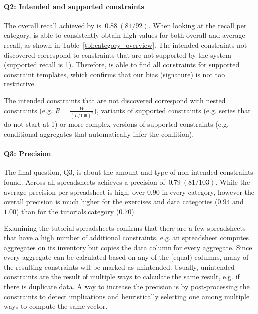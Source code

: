 \paragraph{Q2: Intended and supported constraints}
The overall recall achieved by \sname is~$0.88~(81/92)$.
When looking at the recall per category, \sname is able to consistently obtain high values for both overall and average recall, as shown in Table~\ref{tbl:category_overview}.
The intended constraints not discovered correspond to constraints that are not supported by the system (supported recall is 1).
Therefore, \sname is able to find all constraints for supported constraint templates, which confirms that our bias (signature) is not too restrictive.

The intended constraints that are not discovered correspond with nested constraints (e.g. $R = \frac{W}{(L/100)^2}$), variants of supported constraints (e.g. series that do not start at 1) or more complex versions of supported constraints (e.g. conditional aggregates that automatically infer the condition).

\paragraph{Q3: Precision}
The final question, Q3, is about the amount and type of non-intended constraints found.
Across all spreadsheets \sname achieves a precision of~$0.79~(81/103)$.
While the average precision per spreadsheet is high, over $0.90$ in every category, however the overall precision is much higher for the exercises and data categories ($0.94$ and $1.00$) than for the tutorials category ($0.70$).

Examining the tutorial spreadsheets confirms that there are a few spreadsheets that have a high number of additional constraints, e.g. an spreadsheet computes aggregates on its inventory but copies the data column for every aggregate.
Since every aggregate can be calculated based on any of the (equal) columns, many of the resulting constraints will be marked as unintended.
Usually, unintended constraints are the result of multiple ways to calculate the same result, e.g. if there is duplicate data.
A way to increase the precision is by post-processing the constraints to detect implications and heuristically selecting one among multiple ways to compute the same vector.





